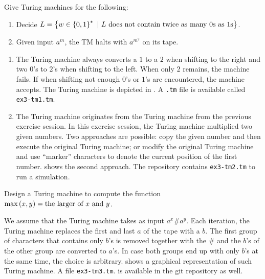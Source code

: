 \documentclass{article}
\begin{document}
\begin{exercise}
Give Turing machines for the following:
\begin{enumerate}
 \item Decide $L=\left\{ w\in\left\{ 0,1 \right\}^{\star}\ |\ \mbox{$L$ does not contain twice as many $0$s as $1$s} \right\}$.
 \item Given input $a^m$, the TM halts with $a^{m^2}$ on its tape.
\end{enumerate}
\begin{answer}
\begin{enumerate}
 \item The Turing machine always converts a $1$ to a $2$ when shifting to the right and two $0$'s to $2$'s when shifting to the left. When only $2$ remains, the machine fails. If when shifting not enough $0$'s or $1$'s are encountered, the machine accepts. The Turing machine is depicted in . A \verb+.tm+ file is available called \verb+ex3-tm1.tm+.
 \item The Turing machine originates from the Turing machine from the previous exercise session. In this exercise session, the Turing machine multiplied two given numbers. Two approaches are possible: copy the given number and then execute the original Turing machine; or modify the original Turing machine and use ``marker'' characters to denote the current position of the first number.  shows the second approach. The repository contains \verb+ex3-tm2.tm+ to run a simulation.
\end{enumerate}
\end{answer}
\end{exercise}

\begin{exercise}
Design a Turing machine to compute the function $\mbox{max}\left( x,y \right)=\mbox{the larger of $x$ and $y$}$.
\begin{answer}
We assume that the Turing machine takes as input $a^x\#a^y$. Each iteration, the Turing machine replaces the first and last $a$ of the tape with a $b$. The first group of characters that contains only $b$'s is removed together with the $\#$ and the $b$'s of the other group are converted to $a$'s. In case both groups end up with only $b$'s at the same time, the choice is arbitrary.  shows a graphical representation of such Turing machine. A file \verb+ex3-tm3.tm+. is available in the git repository as well.
\end{answer}
\end{exercise}
\end{document}
